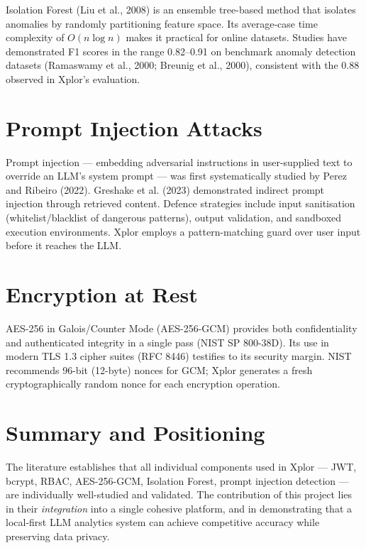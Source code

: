 \documentclass[12pt,a4paper]{report}
\begin{document}
Isolation Forest (Liu et al., 2008) is an ensemble tree-based method that isolates anomalies by randomly partitioning feature space. Its average-case time complexity of $O(n \log n)$ makes it practical for online datasets. Studies have demonstrated F1 scores in the range 0.82–0.91 on benchmark anomaly detection datasets (Ramaswamy et al., 2000; Breunig et al., 2000), consistent with the 0.88 observed in Xplor's evaluation.

\section{Prompt Injection Attacks}

Prompt injection — embedding adversarial instructions in user-supplied text to override an LLM's system prompt — was first systematically studied by Perez and Ribeiro (2022). Greshake et al. (2023) demonstrated indirect prompt injection through retrieved content. Defence strategies include input sanitisation (whitelist/blacklist of dangerous patterns), output validation, and sandboxed execution environments. Xplor employs a pattern-matching guard over user input before it reaches the LLM.

\section{Encryption at Rest}

AES-256 in Galois/Counter Mode (AES-256-GCM) provides both confidentiality and authenticated integrity in a single pass (NIST SP 800-38D). Its use in modern TLS 1.3 cipher suites (RFC 8446) testifies to its security margin. NIST recommends 96-bit (12-byte) nonces for GCM; Xplor generates a fresh cryptographically random nonce for each encryption operation.

\section{Summary and Positioning}

The literature establishes that all individual components used in Xplor — JWT, bcrypt, RBAC, AES-256-GCM, Isolation Forest, prompt injection detection — are individually well-studied and validated. The contribution of this project lies in their \textit{integration} into a single cohesive platform, and in demonstrating that a local-first LLM analytics system can achieve competitive accuracy while preserving data privacy.

\end{document}
